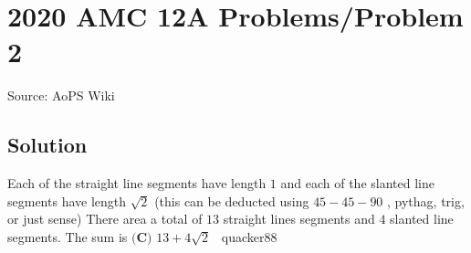 \documentclass[12pt]{article}
\begin{document}
\section*{{2020 AMC 12A Problems/Problem 2}}
Source: AoPS Wiki

\subsection*{Solution}
Each of the straight line segments have length $1$ and each of the slanted line segments have length $\sqrt{2}$ (this can be deducted using $45-45-90$ , pythag, trig, or just sense) There area a total of $13$ straight lines segments and $4$ slanted line segments. The sum is $\boxed{\textbf{(C) } 13 + 4\sqrt{2}}$ ~quacker88
\end{document}
